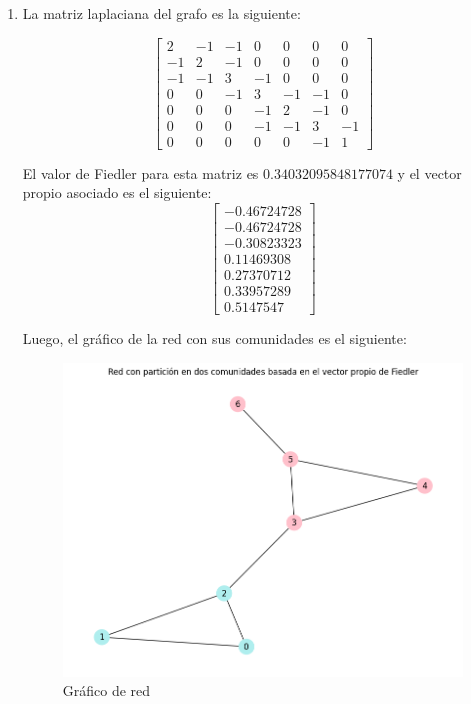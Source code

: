 \documentclass[12pt]{article}
\begin{document}
\begin{enumerate}
    \item La matriz laplaciana del grafo es la siguiente:

    \[
    \begin{bmatrix}
        2 & -1 & -1 &  0 &  0 &  0 &  0 \\
        -1 &  2 & -1 &  0 &  0 &  0 &  0 \\
        -1 & -1 &  3 & -1 &  0 &  0 &  0 \\
        0 &  0 & -1 &  3 & -1 & -1 &  0 \\
        0 &  0 &  0 & -1 &  2 & -1 &  0 \\
        0 &  0 &  0 & -1 & -1 &  3 & -1 \\
        0 &  0 &  0 &  0 &  0 & -1 &  1
    \end{bmatrix}
    \]

    El valor de Fiedler para esta matriz es $0.34032095848177074$ y el vector propio asociado es el siguiente: 
    \[
    \begin{bmatrix}
         -0.46724728 \\
         -0.46724728 \\
         -0.30823323 \\
          0.11469308 \\
          0.27370712 \\
          0.33957289 \\
          0.5147547 
    \end{bmatrix}
    \]

    Luego, el gráfico de la red con sus comunidades es el siguiente:
    \begin{figure}[H]
        \begin{center}
            \includegraphics[scale=0.4]{images/grafico_red.png}
        \end{center}
        \caption{Gráfico de red}
        \label{fig:graph}
    \end{figure}


\end{enumerate}
\end{document}
